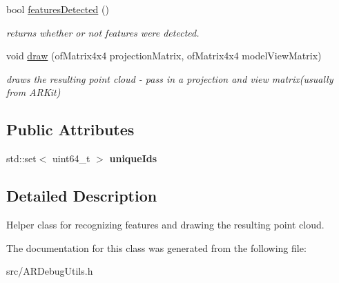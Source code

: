 \begin{DoxyCompactItemize}
bool \hyperlink{class_a_r_debug_utils_1_1_point_cloud_debug_abfaa58360f92ad1b41692175107c99a8}{features\+Detected} ()
\begin{DoxyCompactList}\small\item\em returns whether or not features were detected. \end{DoxyCompactList}\item 
\mbox{\label{class_a_r_debug_utils_1_1_point_cloud_debug_a308b87459dd4f0fc89f25bc65ad7b383}} 
void \hyperlink{class_a_r_debug_utils_1_1_point_cloud_debug_a308b87459dd4f0fc89f25bc65ad7b383}{draw} (of\+Matrix4x4 projection\+Matrix, of\+Matrix4x4 model\+View\+Matrix)
\begin{DoxyCompactList}\small\item\em draws the resulting point cloud -\/ pass in a projection and view matrix(usually from A\+R\+Kit) \end{DoxyCompactList}\end{DoxyCompactItemize}
\subsection*{Public Attributes}
\begin{DoxyCompactItemize}
\item 
\mbox{\label{class_a_r_debug_utils_1_1_point_cloud_debug_a6405deec8e383af9b59593e7e207d1cf}} 
std\+::set$<$ uint64\+\_\+t $>$ {\bfseries unique\+Ids}
\end{DoxyCompactItemize}


\subsection{Detailed Description}
Helper class for recognizing features and drawing the resulting point cloud. 

The documentation for this class was generated from the following file\+:\begin{DoxyCompactItemize}
\item 
src/A\+R\+Debug\+Utils.\+h\end{DoxyCompactItemize}
